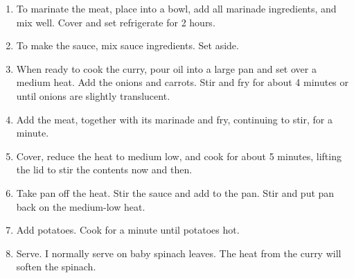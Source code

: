 \documentclass[11pt,a4paper]{article}
\begin{document}
\begin{enumerate}
  \item To marinate the meat, place into a bowl, add all marinade ingredients,
  and mix well. Cover and set refrigerate for 2 hours.

  \item To make the sauce, mix sauce ingredients. Set aside.

  \item When ready to cook the curry, pour oil into a large pan and set over a
  medium heat. Add the onions and carrots. Stir and fry for about 4 minutes or
  until onions are slightly translucent.

  \item Add the meat, together with its marinade and fry, continuing to stir,
  for a minute.

  \item Cover, reduce the heat to medium low, and cook for about 5 minutes,
  lifting the lid to stir the contents now and then.

  \item Take pan off the heat. Stir the sauce and add to the pan. Stir and put
  pan back on the medium-low heat.

  \item Add potatoes. Cook for a minute until potatoes hot.

  \item Serve. I normally serve on baby spinach leaves. The heat from the curry
  will soften the spinach.

\end{enumerate}
\end{document}
